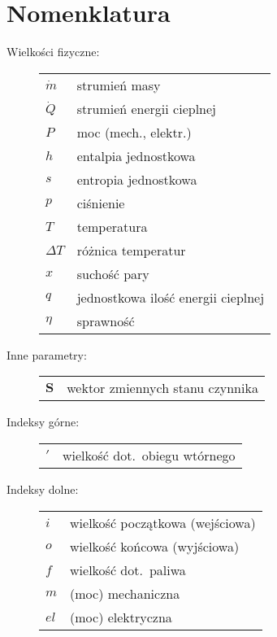 \section{Nomenklatura}

\begin{description}

	\item[Wielkości fizyczne:] \hfill

\begin{tabular}{p{1.2cm}l}
	$\dot m$ & strumień masy \\
	$\dot Q$ & strumień energii cieplnej \\
	$P$ & moc (mech., elektr.) \\
	$h$ & entalpia jednostkowa \\
	$s$ & entropia jednostkowa \\
	$p$ & ciśnienie \\
	$T$ & temperatura \\
	$\Delta T$ & różnica temperatur \\
	$x$ & suchość pary \\
	$q$ & jednostkowa ilość energii cieplnej \\
	$\eta$ & sprawność \\
\end{tabular}

	\item[Inne parametry:] \hfill

\begin{tabular}{p{1.2cm}l}
	$\mathbf{S}$ & wektor zmiennych stanu czynnika \\
\end{tabular}

	\item[Indeksy górne:] \hfill

\begin{tabular}{p{1.2cm}l}
	$'$ & wielkość dot.~obiegu wtórnego \\
\end{tabular}

	\item[Indeksy dolne:] \hfill

\begin{tabular}{p{1.2cm}l}
	$i$ & wielkość początkowa (wejściowa) \\
	$o$ & wielkość końcowa (wyjściowa) \\
	$f$ & wielkość dot.~paliwa \\
	$m$ & (moc) mechaniczna \\
	$el$ & (moc) elektryczna \\
\end{tabular}

\end{description}
